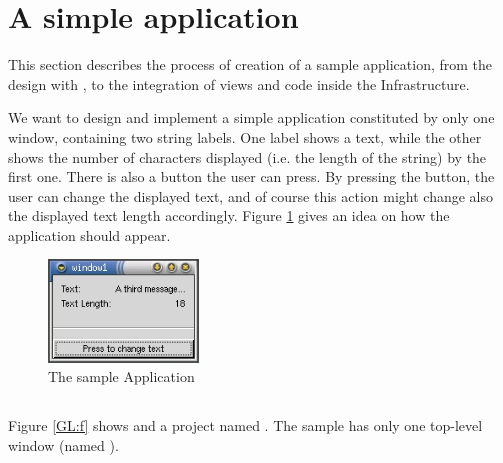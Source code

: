 

\section{\label{SAP} A simple application}
This section describes the process of creation of a sample
application, from the design with \glade, to the integration of views
and code inside the \mvco Infrastructure.

We want to design and implement a simple application constituted by
only one window, containing two string labels. One label shows a text,
while the other shows the number of characters displayed (i.e. the
length of the string) by the first one. There is also a button the
user can press. By pressing the button, the user can change the
displayed text, and of course this action might change also the
displayed text length accordingly. Figure \ref{EX:f} gives an idea on
how the application should appear.

\begin{figure}[htbp]
\begin{center}
\includegraphics[width=4cm]{figs/png/example}
\caption{\label{EX:f}The sample Application}
\end{center}
\end{figure}

\subsection{\label{GLEX}\glade}
Figure \ref{GL:f} shows \glade and a project named .
The sample \gui has only one top-level window (named
).

